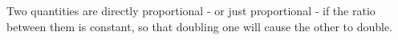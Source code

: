 Two quantities are directly proportional - or
just proportional - if the ratio
between them is constant, so that doubling one will
cause the other to double.
